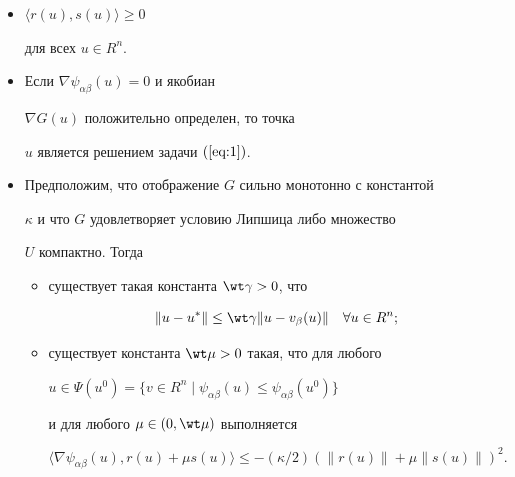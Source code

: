 \begin{prop} \label{pr:3}


\begin{itemize}


\item[a)] $ \langle r(u), s(u)\rangle \geq 0$


для всех $u \in R^{n}$.


\item[b)] Если $ \nabla \psi_{\alpha \beta }(u) = 0$ и якобиан


$\nabla G(u)$ положительно определен, то точка


$u$ является решением задачи $(\ref{eq:1})$.


\item[c)] Предположим, что отображение $G$ сильно монотонно с константой


$\kappa$ и что $G$ удовлетворяет условию Липшица либо множество


$U$ компактно. Тогда


\begin{itemize}


\item[i)] существует такая константа $\wt \gamma > 0$, что


\begin{equation} \label{eq:9}


\| u - u^{*} \| \leq \wt \gamma


\| u- v_{\beta }(u)\| \quad \forall u \in R^{n};


\end{equation}


\item[ii)] существует константа $\wt \mu > 0$ такая, что для любого 


$u \in \Psi (u^{0}) = \{ v \in R^{n} \mid


\psi_{\alpha \beta }(u) \leq \psi_{\alpha \beta }(u^{0}) \}$


и для любого $ \mu \in (0, \wt \mu )$ выполняется


\begin{equation} \label{eq:10}


\langle \nabla \psi_{\alpha \beta }(u), r(u) + \mu s(u) \rangle \leq


- ( \kappa /2) (\| r(u) \| + \mu \| s(u) \|)^{2}.


\end{equation}


\end{itemize}


\end{itemize}


\end{prop}





